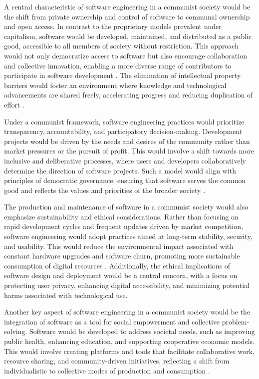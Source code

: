 \begin{refsection}
A central characteristic of software engineering in a communist society would be the shift from private ownership and control of software to communal ownership and open access. In contrast to the proprietary models prevalent under capitalism, software would be developed, maintained, and distributed as a public good, accessible to all members of society without restriction. This approach would not only democratize access to software but also encourage collaboration and collective innovation, enabling a more diverse range of contributors to participate in software development \cite[pp.~29-32]{stallman2010free}. The elimination of intellectual property barriers would foster an environment where knowledge and technological advancements are shared freely, accelerating progress and reducing duplication of effort \cite[pp.~95-97]{bollier2016commons}.

Under a communist framework, software engineering practices would prioritize transparency, accountability, and participatory decision-making. Development projects would be driven by the needs and desires of the community rather than market pressures or the pursuit of profit. This would involve a shift towards more inclusive and deliberative processes, where users and developers collaboratively determine the direction of software projects. Such a model would align with principles of democratic governance, ensuring that software serves the common good and reflects the values and priorities of the broader society \cite[pp.~141-143]{schneider2018everything}.

The production and maintenance of software in a communist society would also emphasize sustainability and ethical considerations. Rather than focusing on rapid development cycles and frequent updates driven by market competition, software engineering would adopt practices aimed at long-term stability, security, and usability. This would reduce the environmental impact associated with constant hardware upgrades and software churn, promoting more sustainable consumption of digital resources \cite[pp.~82-84]{fuchs2014digital}. Additionally, the ethical implications of software design and deployment would be a central concern, with a focus on protecting user privacy, enhancing digital accessibility, and minimizing potential harms associated with technological use.

Another key aspect of software engineering in a communist society would be the integration of software as a tool for social empowerment and collective problem-solving. Software would be developed to address societal needs, such as improving public health, enhancing education, and supporting cooperative economic models. This would involve creating platforms and tools that facilitate collaborative work, resource sharing, and community-driven initiatives, reflecting a shift from individualistic to collective modes of production and consumption \cite[pp.~204-206]{benkler2010wealth}.


\end{refsection}
